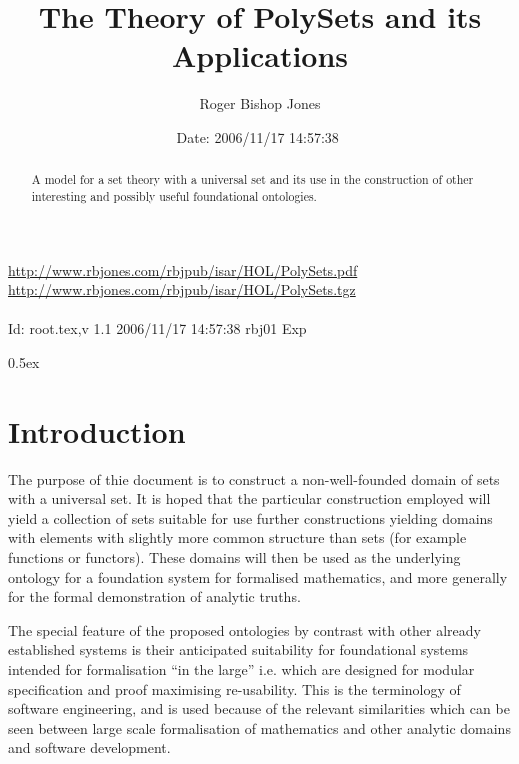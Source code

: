 \documentclass[11pt,a4paper]{article}
\begin{document}
\title{The Theory of PolySets and its Applications}
\author{Roger Bishop Jones}
\date{$ $Date: 2006/11/17 14:57:38 $ $}
\maketitle

\begin{abstract}
A model for a set theory with a universal set and its use in the construction of other interesting and possibly useful foundational ontologies.
\end{abstract}

\vfill
\begin{centering}
{\footnotesize
\href{http://www.rbjones.com/rbjpub/isar/HOL/PolySets.pdf}{http://www.rbjones.com/rbjpub/isar/HOL/PolySets.pdf}\\
\href{http://www.rbjones.com/rbjpub/isar/HOL/PolySets.tgz}{http://www.rbjones.com/rbjpub/isar/HOL/PolySets.tgz}\\
\ \\
$ $Id: root.tex,v 1.1 2006/11/17 14:57:38 rbj01 Exp $ $\\
}%
\end{centering}

\newpage

\tableofcontents

\parindent 0pt\parskip 0.5ex
\newpage
\section{Introduction}

The purpose of thie document is to construct a non-well-founded domain of sets with a universal set.
It is hoped that the particular construction employed will yield a collection of sets suitable for use further constructions yielding domains with elements with slightly more common structure than sets (for example functions or functors).
These domains will then be used as the underlying ontology for a foundation system for formalised mathematics, and more generally for the formal demonstration of analytic truths.

The special feature of the proposed ontologies by contrast with other already established systems is their anticipated suitability for foundational systems intended for formalisation ``in the large'' i.e. which are designed for modular specification and proof maximising re-usability.
This is the terminology of software engineering, and is used because of the relevant similarities which can be seen between large scale formalisation of mathematics and other analytic domains and software development.
\end{document}
